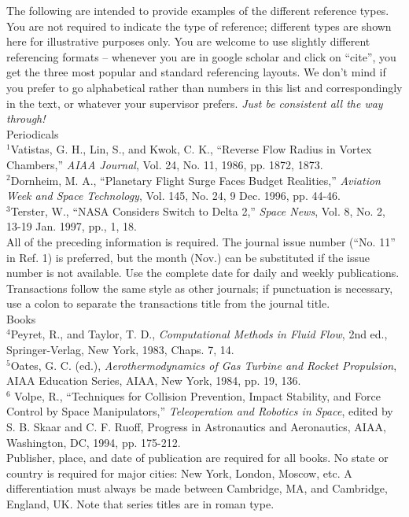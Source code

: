 The following are intended to provide examples of the different reference types. You are not required to indicate the type of reference; different types are shown here for illustrative purposes only. You are welcome to use slightly different referencing formats – whenever you are in google scholar and click on “cite”, you get the three most popular and standard referencing layouts. We don’t mind if you prefer to go alphabetical rather than numbers in this list and correspondingly in the text, or whatever your supervisor prefers. \textit{Just be consistent all the way through!} \\

Periodicals \\ $^1$Vatistas, G. H., Lin, S., and Kwok, C. K., “Reverse Flow Radius in Vortex Chambers,” \textit{AIAA Journal}, Vol. 24, No. 11, 1986, pp. 1872, 1873. \\ $^2$Dornheim, M. A., “Planetary Flight Surge Faces Budget Realities,” \textit{Aviation Week and Space Technology}, Vol. 145, No. 24, 9 Dec. 1996, pp. 44-46. \\ $^3$Terster, W., “NASA Considers Switch to Delta 2,” \textit{Space News}, Vol. 8, No. 2, 13-19 Jan. 1997, pp., 1, 18. \\

All of the preceding information is required. The journal issue number (“No. 11” in Ref. 1) is preferred, but the month (Nov.) can be substituted if the issue number is not available. Use the complete date for daily and weekly publications. Transactions follow the same style as other journals; if punctuation is necessary, use a colon to separate the transactions title from the journal title. \\

Books \\ $^4$Peyret, R., and Taylor, T. D., \textit{Computational Methods in Fluid Flow}, 2nd ed., Springer-Verlag, New York, 1983, Chaps. 7, 14. \\ $^5$Oates, G. C. (ed.), \textit{Aerothermodynamics of Gas Turbine and Rocket Propulsion}, AIAA Education Series, AIAA, New York, 1984, pp. 19, 136. \\ $^6$ Volpe, R., “Techniques for Collision Prevention, Impact Stability, and Force Control by Space Manipulators,” \textit{Teleoperation and Robotics in Space}, edited by S. B. Skaar and C. F. Ruoff, Progress in Astronautics and Aeronautics, AIAA, Washington, DC, 1994, pp. 175-212. \\

Publisher, place, and date of publication are required for all books. No state or country is required for major cities: New York, London, Moscow, etc. A differentiation must always be made between Cambridge, MA, and Cambridge, England, UK. Note that series titles are in roman type. \\

